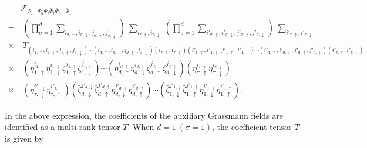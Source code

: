 \documentclass[nofootinbib,prd,aps,superscriptaddress,preprintnumbers,twocolumn,showpacs]{revtex4-1}
\begin{document}
\begin{widetext}
\begin{align}
\label{eq:d+1_gtensor}
	&\mathcal{T}_{\Psi_{1}\cdots\Psi_{d}\Psi_{\tau}\bar{\Psi}_{\tau}\bar{\Psi}_{d}\cdots\bar{\Psi}_{1}}\nonumber\\
	=&~\left(\prod_{\sigma=1}^{d}\sum_{i_{\sigma,\uparrow},i_{\sigma,\downarrow},j_{\sigma,\uparrow},j_{\sigma,\downarrow}}\right)~\sum_{i_{\tau,\uparrow},i_{\tau,\downarrow}}~\left(\prod_{\sigma=1}^{d}\sum_{i'_{\sigma,\uparrow},i'_{\sigma,\downarrow},j'_{\sigma,\uparrow},j'_{\sigma,\downarrow}}\right)~\sum_{i'_{\tau,\uparrow},i'_{\tau,\downarrow}}\nonumber\\
	\times&~ T_{(i_{1,\uparrow},i_{1,\downarrow},j_{1,\uparrow},j_{1,\downarrow})\cdots(i_{d,\uparrow},i_{d,\downarrow},j_{d,\uparrow},j_{d,\downarrow})(i_{\tau,\uparrow},i_{\tau,\downarrow})(i'_{1,\uparrow},i'_{1,\downarrow},j'_{1,\uparrow},j'_{1,\downarrow})\cdots(i'_{d,\uparrow},i'_{d,\downarrow},j'_{d,\uparrow},j'_{d,\downarrow})(i'_{\tau,\uparrow},i'_{\tau,\downarrow})}\nonumber\\
	\times&~\left(\eta_{1,\uparrow}^{i_{1,\uparrow}}\eta_{1,\downarrow}^{i_{1,\downarrow}}\zeta_{1,\uparrow}^{j_{1,\uparrow}}\zeta_{1,\downarrow}^{j_{1,\downarrow}}\right)
	\cdots
	\left(\eta_{d,\uparrow}^{i_{d,\uparrow}}\eta_{d,\downarrow}^{i_{d,\downarrow}}\zeta_{d,\uparrow}^{j_{d,\uparrow}}\zeta_{d,\downarrow}^{j_{d,\downarrow}}\right)
	\left(\eta_{\tau,\uparrow}^{i_{\tau,\uparrow}}\eta_{\tau,\downarrow}^{i_{\tau,\downarrow}}\right)\nonumber\\
	\times&~\left(\bar{\eta}_{\tau,\downarrow}^{i'_{\tau,\downarrow}}\bar{\eta}_{\tau,\uparrow}^{i'_{\tau,\uparrow}}\right)
	\left(\bar{\zeta}_{d,\downarrow}^{j'_{d,\downarrow}}\bar{\zeta}_{d,\uparrow}^{j'_{d,\uparrow}}\bar{\eta}_{d,\downarrow}^{i'_{d,\downarrow}}\bar{\eta}_{d,\uparrow}^{i'_{d,\uparrow}}\right)
	\cdots
	\left(\bar{\zeta}_{1,\downarrow}^{j'_{1,\downarrow}}\bar{\zeta}_{1,\uparrow}^{j'_{1,\uparrow}}\bar{\eta}_{1,\downarrow}^{i'_{1,\downarrow}}\bar{\eta}_{1,\uparrow}^{i'_{1,\uparrow}}\right).
\end{align}
\end{widetext}
In the above expression, the coefficients of the auxiliary Grassmann fields are identified as a multi-rank tensor $T$. When $d=1~(\sigma=1)$, the coefficient tensor $T$ is given by
\end{document}
